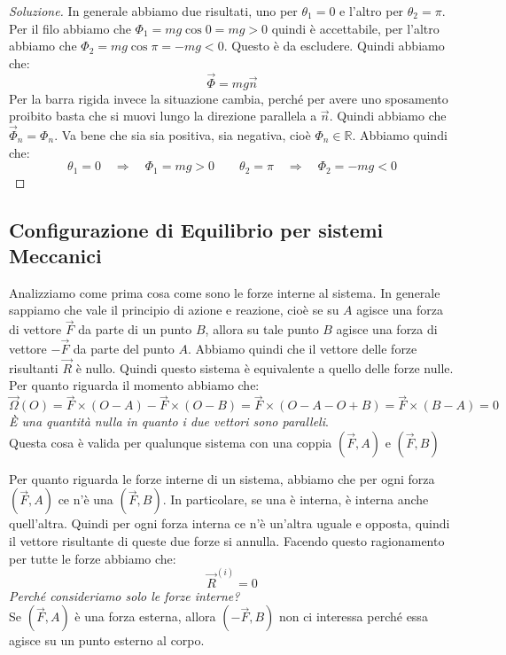 \documentclass[11pt,a4paper,twoside]{article}
\theoremstyle{definition}
\newenvironment{sol}
	{\renewcommand\qedsymbol{$\blacksquare$}\begin{proof}[Soluzione]}
	{\end{proof}}
\begin{document}
\begin{sol}
	In generale abbiamo due risultati, uno per $\theta_1 = 0$ e l'altro per $\theta_2 = \pi$.\\
	Per il filo abbiamo che $\Phi_1 = mg\cos 0 = mg>0$ quindi è accettabile, per l'altro abbiamo che $\Phi_2=mg \cos \pi = -mg<0$. Questo è da escludere. Quindi abbiamo che:
	\[ \vec \Phi = mg\vec n \]
	Per la barra rigida invece la situazione cambia, perché per avere uno sposamento proibito basta che si muovi lungo la direzione parallela a $\vec n$. Quindi abbiamo che $\vec \Phi_n = \Phi_n$. Va bene che sia sia positiva, sia negativa, cioè $\Phi_n \in \mathbb R$. Abbiamo quindi che:
	\[ \theta_1 = 0\quad\Rightarrow \quad \Phi_1 = mg>0\qquad \theta_2 = \pi \quad \Rightarrow \quad \Phi_2 = -mg<0 \]
\end{sol}

\subsection{Configurazione di Equilibrio per sistemi Meccanici}

Analizziamo come prima cosa come sono le forze interne al sistema. In generale sappiamo che vale il principio di azione e reazione, cioè se su $A$ agisce una forza di vettore $\vec F$ da parte di un punto $B$, allora su tale punto $B$ agisce una forza di vettore $-\vec F$ da parte del punto $A$. Abbiamo quindi che il vettore delle forze risultanti $\vec R$ è nullo. Quindi questo sistema è equivalente a quello delle forze nulle.
Per quanto riguarda il momento abbiamo che:
\[ \vec \Omega (O) = \vec F \times (O-A) - \vec F \times (O-B) = \vec F \times (O-A-O+B) = \vec F\times (B-A) = 0\]
\textit{È una quantità nulla in quanto i due vettori sono paralleli}.\\
Questa cosa è valida per qualunque sistema con una coppia $(\vec F, A)$ e $(\vec F, B)$

\begin{center}
\end{center}

Per quanto riguarda le forze interne di un sistema, abbiamo che per ogni forza $(\vec F, A)$ ce n'è una $(\vec F,B)$. In particolare, se una è interna, è interna anche quell'altra. Quindi per ogni forza interna ce n'è un'altra uguale e opposta, quindi il vettore risultante di queste due forze si annulla. Facendo questo ragionamento per tutte le forze abbiamo che:
\[ \vec R^{(i)} = 0 \]
\textit{Perché consideriamo solo le forze interne?}\\
Se $(\vec F,A)$ è una forza esterna, allora $(-\vec F, B)$ non ci interessa perché essa agisce su un punto esterno al corpo.
\end{document}
